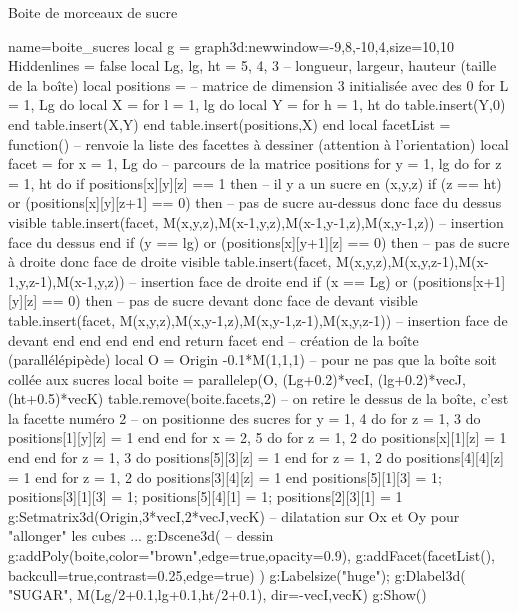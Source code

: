 \begin{demo}{Boite de morceaux de sucre}
\begin{luadraw}{name=boite_sucres}
local g = graph3d:new{window={-9,8,-10,4},size={10,10}}
Hiddenlines = false
local Lg, lg, ht = 5, 4, 3 -- longueur, largeur, hauteur (taille de la boîte)
local positions = {} -- matrice de dimension 3 initialisée avec des 0
for L = 1, Lg do
    local X = {}
    for l = 1, lg do
        local Y = {}
        for h = 1, ht do table.insert(Y,0) end
        table.insert(X,Y)
    end
    table.insert(positions,X)
end
local facetList = function() -- renvoie la liste des facettes à dessiner (attention à l'orientation)
    local facet = {}
    for x = 1, Lg do -- parcours de la matrice positions
        for y = 1, lg do
            for z = 1, ht do
                if positions[x][y][z] == 1 then -- il y a un sucre en (x,y,z)
                    if (z == ht) or (positions[x][y][z+1] == 0) then -- pas de sucre au-dessus donc face du dessus visible
                        table.insert(facet, {M(x,y,z),M(x-1,y,z),M(x-1,y-1,z),M(x,y-1,z)}) -- insertion face du dessus
                    end
                    if (y == lg) or (positions[x][y+1][z] == 0) then -- pas de sucre à droite donc face de droite visible
                        table.insert(facet, {M(x,y,z),M(x,y,z-1),M(x-1,y,z-1),M(x-1,y,z)}) -- insertion face de droite
                    end
                    if (x == Lg) or (positions[x+1][y][z] == 0) then -- pas de sucre devant donc face de devant visible
                        table.insert(facet, {M(x,y,z),M(x,y-1,z),M(x,y-1,z-1),M(x,y,z-1)}) -- insertion face de devant
                    end
                end
            end
        end
    end
    return facet
end
-- création de la boîte (parallélépipède)
local O = Origin -0.1*M(1,1,1) -- pour ne pas que la boîte soit collée aux sucres
local boite = parallelep(O, (Lg+0.2)*vecI, (lg+0.2)*vecJ, (ht+0.5)*vecK)
table.remove(boite.facets,2) -- on retire le dessus de la boîte, c'est la facette numéro 2
-- on positionne des sucres
for y = 1, 4 do for z = 1, 3 do  positions[1][y][z] = 1 end end
for x = 2, 5 do for z = 1, 2 do positions[x][1][z] = 1 end end
for z = 1, 3 do positions[5][3][z] = 1 end
for z = 1, 2 do positions[4][4][z] = 1 end
for z = 1, 2 do positions[3][4][z] = 1 end
positions[5][1][3] = 1; positions[3][1][3] = 1; positions[5][4][1] = 1; positions[2][3][1] = 1
g:Setmatrix3d({Origin,3*vecI,2*vecJ,vecK}) -- dilatation sur Ox et Oy pour "allonger" les cubes ...
g:Dscene3d( -- dessin
    g:addPoly(boite,{color="brown",edge=true,opacity=0.9}),
    g:addFacet(facetList(), {backcull=true,contrast=0.25,edge=true})    )
g:Labelsize("huge"); g:Dlabel3d( "SUGAR", M(Lg/2+0.1,lg+0.1,ht/2+0.1), {dir={-vecI,vecK}})
g:Show()
\end{luadraw}
\end{demo}

